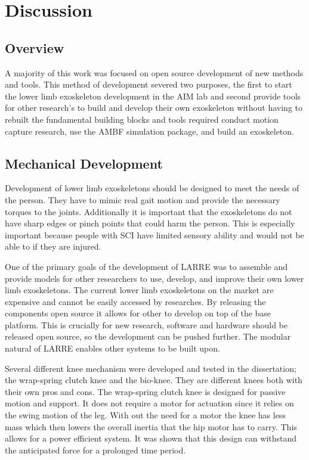 \chapter{Discussion}

\section{Overview}

A majority of this work was focused on open source development of new methods and tools. This method of development severed two purposes, the first to start the lower limb exoskeleton development in the AIM lab and second provide tools for other research's to build and develop their own exoskeleton without having to rebuilt the fundamental building blocks and tools required conduct motion capture research, use the AMBF simulation package, and build an exoskeleton. 

\section{Mechanical Development}

Development of lower limb exoskeletons should be designed to meet the needs of the person. They have to mimic real gait motion and provide the necessary torques to the joints. Additionally it is important that the exoskeletons do not have sharp edges or pinch points that could harm the person. This is especially important because people with SCI have limited sensory ability and would not be able to if they are injured. 

One of the primary goals of the development of LARRE was to assemble and provide models for other researchers to use, develop, and improve their own lower limb exoskeletons. The current lower limb exoskeletons on the market are expensive and cannot be easily accessed by researches. By releasing the components open source it allows for other to develop on top of the base platform. This is crucially for new research, software and hardware should be released open source, so the development can be pushed further. The modular natural of LARRE enables other systems to be built upon. 

Several different knee mechanism were developed and tested in the dissertation; the wrap-spring clutch knee and the bio-knee. They are different knees both with their own pros and cons. The wrap-spring clutch knee is designed for passive motion and support. It does not require a motor for actuation since it relies on the swing motion of the leg. With out the need for a motor the knee has less mass which then lowers the overall inertia that the hip motor has to carry. This allows for a power efficient system. It was shown that this design can withstand the anticipated force for a prolonged time period.   

